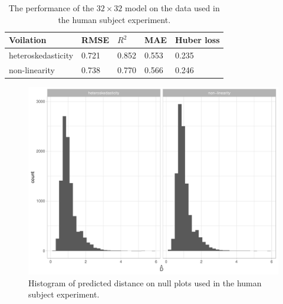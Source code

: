 \documentclass[]{interact}
\theoremstyle{plain}%
\theoremstyle{definition}
\theoremstyle{remark}
\begin{document}
\begin{table}

\caption{\label{tab:experiment-performance}The performance of the $32 \times 32$ model on the data used in the human subject experiment.}
\centering
\begin{tabular}[t]{lllll}
\toprule
Voilation & RMSE & $R^2$ & MAE & Huber loss\\
\midrule
heteroskedasticity & 0.721 & 0.852 & 0.553 & 0.235\\
non-linearity & 0.738 & 0.770 & 0.566 & 0.246\\
\bottomrule
\end{tabular}
\end{table}

\begin{figure}

{\centering \includegraphics[width=1\linewidth]{paper_files/figure-latex/hist-null-human-1} 

}

\caption{Histogram of predicted distance on null plots used in the human subject experiment.}\label{fig:hist-null-human}
\end{figure}
\end{document}
